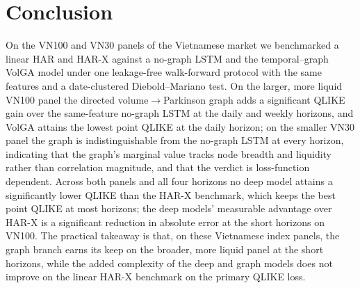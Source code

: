 \documentclass[runningheads]{llncs}
\begin{document}
\section{Conclusion}
On the VN100 and VN30 panels of the Vietnamese market we benchmarked a linear HAR and HAR-X against a
no-graph LSTM and the temporal--graph VolGA model under one leakage-free walk-forward protocol with
the same features and a date-clustered Diebold--Mariano test. On the larger, more liquid VN100 panel
the directed volume$\to$Parkinson graph adds a significant QLIKE gain over the same-feature no-graph
LSTM at the daily and weekly horizons, and VolGA attains the lowest point QLIKE at the daily horizon;
on the smaller VN30 panel the graph is indistinguishable from the no-graph LSTM at every horizon,
indicating that the graph's marginal value tracks node breadth and liquidity rather than correlation
magnitude, and that the verdict is loss-function dependent. Across both panels and all four horizons
no deep model attains a significantly lower QLIKE than the HAR-X benchmark, which keeps the best point
QLIKE at most horizons; the deep models' measurable advantage over HAR-X is a significant reduction in
absolute error at the short horizons on VN100. The practical takeaway is that, on these Vietnamese
index panels, the graph branch earns its keep on the broader, more liquid panel at the short horizons,
while the added complexity of the deep and graph models does not improve on the linear HAR-X benchmark
on the primary QLIKE loss.
\end{document}
